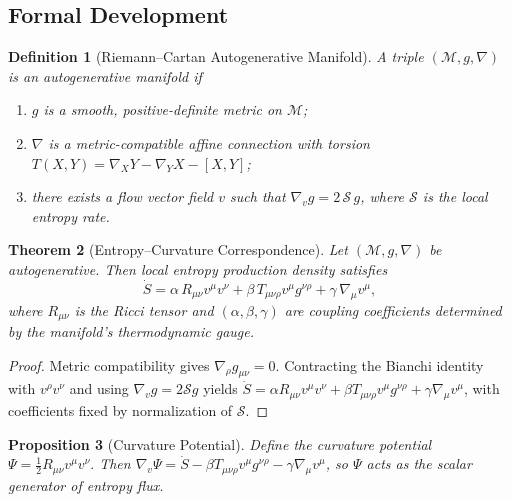 \documentclass[12pt,a4paper,twoside,openright]{book}
\newtheorem{theorem}{Theorem}
\newtheorem{proposition}[theorem]{Proposition}
\newtheorem{definition}[theorem]{Definition}
\begin{document}
\subsection*{Formal Development}

\begin{definition}[Riemann–Cartan Autogenerative Manifold]
A triple $(\mathcal{M},g,\nabla)$ is an \emph{autogenerative manifold} if
\begin{enumerate}
\item $g$ is a smooth, positive-definite metric on $\mathcal{M}$;
\item $\nabla$ is a metric-compatible affine connection with torsion
  $T(X,Y)=\nabla_XY-\nabla_YX-[X,Y]$;
\item there exists a flow vector field $v$ such that 
  $\nabla_v g=2\,\mathcal{S}\,g$, where $\mathcal{S}$ is the local entropy rate.
\end{enumerate}
\end{definition}

\begin{theorem}[Entropy–Curvature Correspondence]
\label{thm:entropycurvature}
Let $(\mathcal{M},g,\nabla)$ be autogenerative.  
Then local entropy production density satisfies
\begin{equation}
\dot S
  = \alpha\,R_{\mu\nu}v^\mu v^\nu
    + \beta\,T_{\mu\nu\rho}v^\mu g^{\nu\rho}
    + \gamma\,\nabla_\mu v^\mu ,
\end{equation}
where $R_{\mu\nu}$ is the Ricci tensor and $(\alpha,\beta,\gamma)$ are coupling coefficients determined by the manifold’s thermodynamic gauge.  
\end{theorem}

\begin{proof}
Metric compatibility gives $\nabla_\rho g_{\mu\nu}=0$.  
Contracting the Bianchi identity with $v^\rho v^\nu$ and using $\nabla_v g=2\mathcal{S}g$ yields 
$\dot S=\alpha R_{\mu\nu}v^\mu v^\nu + \beta T_{\mu\nu\rho}v^\mu g^{\nu\rho}+\gamma\nabla_\mu v^\mu$, 
with coefficients fixed by normalization of $\mathcal{S}$.  
\end{proof}

\begin{proposition}[Curvature Potential]
Define the curvature potential
\(
\Psi=\tfrac12R_{\mu\nu}v^\mu v^\nu.
\)
Then $\nabla_v\Psi=\dot S-\beta T_{\mu\nu\rho}v^\mu g^{\nu\rho}-\gamma\nabla_\mu v^\mu$,  
so $\Psi$ acts as the scalar generator of entropy flux.
\end{proposition}
\end{document}
